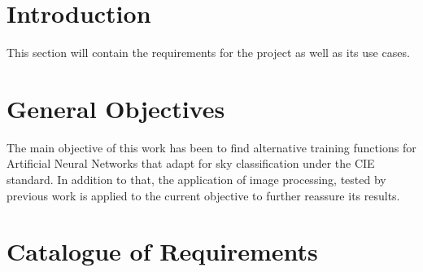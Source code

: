 
\section{Introduction}
This section will contain the requirements for the project as well as its use cases.



\section{General Objectives}
The main objective of this work has been to find alternative training functions for Artificial Neural Networks that adapt for sky classification under the CIE standard. In addition to that, the application of image processing, tested by previous work \cite{skyClassANN-Granados-Lopéz} is applied to the current objective to further reassure its results.
\section{Catalogue of Requirements}
